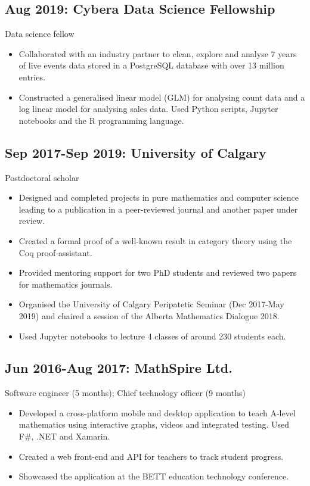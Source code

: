 \documentclass[11pt]{article}
\begin{document}
\subsection*{Aug 2019: Cybera Data Science Fellowship}
\label{sec:orgb6f2de9}

Data science fellow

\begin{itemize}
\item Collaborated with an industry partner to clean, explore and analyse 7 years of live events data stored in a PostgreSQL database with over 13 million entries.
\item Constructed a generalised linear model (GLM) for analysing count data and a log linear model for analysing sales data. Used Python scripts, Jupyter notebooks and the R programming language.
\end{itemize}

\subsection*{Sep 2017-Sep 2019: University of Calgary}
\label{sec:org34e3b46}

Postdoctoral scholar

\begin{itemize}
\item Designed and completed projects in pure mathematics and computer science leading to a publication in a peer-reviewed journal and another paper under review.
\item Created a formal proof of a well-known result in category theory using the Coq proof assistant.
\item Provided mentoring support for two PhD students and reviewed two papers for mathematics journals.
\item Organised the University of Calgary Peripatetic Seminar (Dec 2017-May 2019) and chaired a session of the Alberta Mathematics Dialogue 2018.
\item Used Jupyter notebooks to lecture 4 classes of around 230 students each.
\end{itemize}

\subsection*{Jun 2016-Aug 2017: MathSpire Ltd.}
\label{sec:orgf338a03}

Software engineer (5 months); Chief technology officer (9 months)

\begin{itemize}
\item Developed a cross-platform mobile and desktop application to teach A-level mathematics using interactive graphs, videos and integrated testing. Used F\#, .NET and Xamarin.
\item Created a web front-end and API for teachers to track student progress.
\item Showcased the application at the BETT education technology conference.
\end{itemize}
\end{document}

